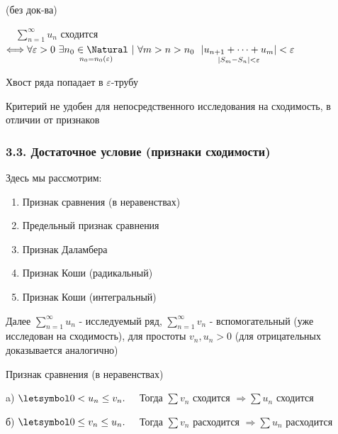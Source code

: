 \documentclass[12pt]{article}
\begin{document}
    \begin{MyTheorem}
        \Ths (без док-ва) 
        
        $\quad \sum_{n = 1}^\infty u_n$ сходится $\Longleftrightarrow \forall \varepsilon > 0 \ \exists \underset{n_0 = n_0 (\varepsilon)}{n_0 \in \Natural} \ | \ \forall m > n > n_0 \ \ \underset{|S_m - S_n| < \varepsilon}{|u_{n + 1} + \dots + u_m|} < \varepsilon$
    \end{MyTheorem}

    \Nota Хвост ряда попадает в $\varepsilon$-трубу

    \Notas Критерий не удобен для непосредственного исследования на сходимость, в отличии от признаков


    \subsubsection{3.3. Достаточное условие (признаки сходимости)}

    Здесь мы рассмотрим:

    \begin{enumerate}
        \item Признак сравнения (в неравенствах)
        \item Предельный признак сравнения
        \item Признак Даламбера
        \item Признак Коши (радикальный)
        \item Признак Коши (интегральный)
    \end{enumerate}

    Далее $\sum_{n = 1}^\infty u_n$ - исследуемый ряд, $\sum_{n = 1}^\infty v_n$ - вспомогательный (уже исследован на сходимость),
    для простоты $v_n, u_n > 0$ (для отрицательных доказывается аналогично)

    \mediumvspace

    \hypertarget{comparisonsign}{}

    \begin{MyTheorem}
         Признак сравнения (в неравенствах)

        a) $\letsymbol 0 < u_n \leq v_n. \quad$ Тогда $\sum v_n$ сходится $\Longrightarrow \sum u_n$ сходится

        б) $\letsymbol 0 \leq v_n \leq u_n. \quad$ Тогда $\sum v_n$ расходится $\Longrightarrow \sum u_n$ расходится
    \end{MyTheorem}
\end{document}
